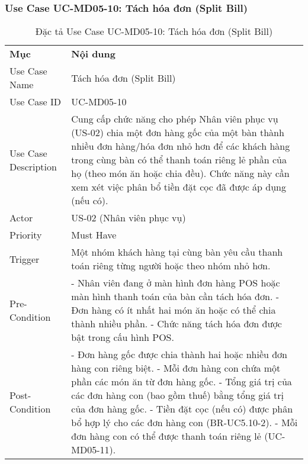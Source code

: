 \subsubsection{Use Case UC-MD05-10: Tách hóa đơn (Split Bill)}

\begin{longtable}{|m{4cm}|p{11cm}|}
\caption{Đặc tả Use Case UC-MD05-10: Tách hóa đơn (Split Bill)} \label{tab:uc_md05_10} \\
\hline

\endhead %
\hline
\endfoot %
\hline
\endlastfoot %
\multicolumn{2}{|c|}{\textbf{2.1. Tóm tắt (Summary)}} \\
\hline
\textbf{Mục} & \textbf{Nội dung} \\
\hline
Use Case Name & Tách hóa đơn (Split Bill) \\
\hline
Use Case ID & UC-MD05-10 \\
\hline
Use Case Description & Cung cấp chức năng cho phép Nhân viên phục vụ (US-02) chia một đơn hàng gốc của một bàn thành nhiều đơn hàng/hóa đơn nhỏ hơn để các khách hàng trong cùng bàn có thể thanh toán riêng lẻ phần của họ (theo món ăn hoặc chia đều). Chức năng này cần xem xét việc phân bổ tiền đặt cọc đã được áp dụng (nếu có). \\
\hline
Actor & US-02 (Nhân viên phục vụ) \\
\hline
Priority & Must Have \\
\hline
Trigger & Một nhóm khách hàng tại cùng bàn yêu cầu thanh toán riêng từng người hoặc theo nhóm nhỏ hơn. \\
\hline
Pre-Condition & - Nhân viên đang ở màn hình đơn hàng POS hoặc màn hình thanh toán của bàn cần tách hóa đơn. \newline - Đơn hàng có ít nhất hai món ăn hoặc có thể chia thành nhiều phần. \newline - Chức năng tách hóa đơn được bật trong cấu hình POS. \\
\hline
Post-Condition & - Đơn hàng gốc được chia thành hai hoặc nhiều đơn hàng con riêng biệt. \newline - Mỗi đơn hàng con chứa một phần các món ăn từ đơn hàng gốc. \newline - Tổng giá trị của các đơn hàng con (bao gồm thuế) bằng tổng giá trị của đơn hàng gốc. \newline - Tiền đặt cọc (nếu có) được phân bổ hợp lý cho các đơn hàng con (BR-UC5.10-2). \newline - Mỗi đơn hàng con có thể được thanh toán riêng lẻ (UC-MD05-11). \\

\end{longtable}
